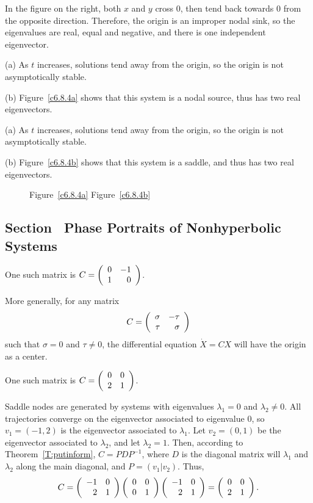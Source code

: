 \para In the figure on the right, both $x$ and $y$ cross $0$, then
tend back towards $0$ from the opposite direction.  Therefore, the origin
is an improper nodal sink, so the eigenvalues are real, equal and
negative, and there is one independent eigenvector.

(a) As $t$ increases, solutions tend away from the origin, so the origin
is not asymptotically stable.

(b) Figure~\ref{c6.8.4a} shows that this system is a nodal source,
thus has two real eigenvectors.

(a) As $t$ increases, solutions tend away from the origin, so the origin
is not asymptotically stable.

(b) Figure~\ref{c6.8.4b} shows that this system is a saddle, and thus
has two real eigenvectors.

\begin{figure}[htb]
                       \centerline{%
                       }
                \centerline{Figure~\ref{c6.8.4a}\hspace{2.1in}
Figure~\ref{c6.8.4b}}
\end{figure}


\subsection*{Section~\protect{\ref{S:6.9}} Phase Portraits of Nonhyperbolic
Systems}

 \ans One such matrix is $C = \left(\begin{array}{rr} 0 & -1\\ 1 &0\end{array}\right)$.

\soln More generally, for any matrix
\[
C = \left(\begin{array}{rr} \sigma & -\tau\\ \tau &\sigma\end{array}\right)
\]
such that $\sigma = 0$ and $\tau \neq 0$, the differential equation
$\dot{X} = CX$ will have the origin as a center.

 \ans One such matrix is $C = \left(\begin{array}{rr} 0 & 0\\ 2 &1\end{array}\right)$.

\soln Saddle nodes are generated by systems with eigenvalues $\lambda_1
= 0$ and $\lambda_2 \neq 0$.  All trajectories converge on the
eigenvector associated to eigenvalue $0$, so $v_1 = (-1,2)$ is the
eigenvector associated to $\lambda_1$.  Let $v_2 = (0,1)$ be the
eigenvector associated to $\lambda_2$, and let $\lambda_2 = 1$.  Then,
according to Theorem~\ref{T:putinform}, $C
= PDP^{-1}$, where $D$ is the diagonal matrix will $\lambda_1$ and
$\lambda_2$ along the main diagonal, and $P = (v_1|v_2)$.  Thus,
\[
C = \left(\begin{array}{rr} -1 & 0\\ 2 &1\end{array}\right)\left(\begin{array}{rr} 0 & 0\\ 0 &1\end{array}\right)\left(\begin{array}{rr} -1 & 0\\ 2 &1\end{array}\right)
= \left(\begin{array}{rr} 0 & 0\\ 2 &1\end{array}\right).
\]

